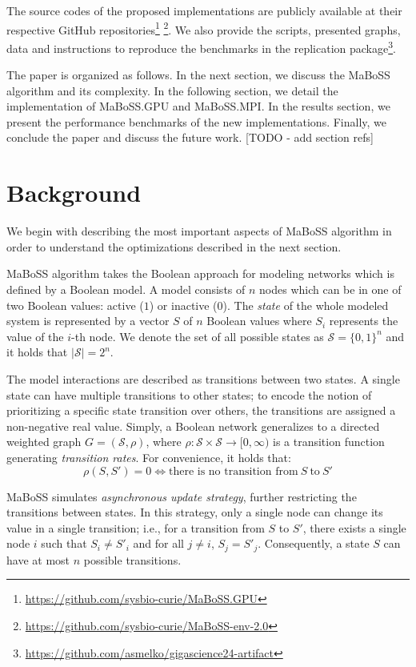 \documentclass[times, twoside]{zHenriquesLab-StyleBioRxiv}
\begin{document}
The source codes of the proposed implementations are publicly available at their respective GitHub repositories\footnote{\url{https://github.com/sysbio-curie/MaBoSS.GPU}} \footnote{\url{https://github.com/sysbio-curie/MaBoSS-env-2.0}}. We also provide the scripts, presented graphs, data and instructions to reproduce the benchmarks in the replication package\footnote{\url{https://github.com/asmelko/gigascience24-artifact}}.

The paper is organized as follows. In the next section, we discuss the MaBoSS algorithm and its complexity. In the following section, we detail the implementation of MaBoSS.GPU and MaBoSS.MPI. In the results section, we present the performance benchmarks of the new implementations. Finally, we conclude the paper and discuss the future work. [TODO - add section refs]


\section*{Background}

We begin with describing the most important aspects of MaBoSS algorithm in order to understand the optimizations described in the next section.  

MaBoSS algorithm takes the Boolean approach for modeling networks which is defined by a Boolean model. A model consists of $n$ nodes which can be in one of two Boolean values: active ($1$) or inactive ($0$). The \emph{state} of the whole modeled system is represented by a vector $S$ of $n$ Boolean values where $S_i$ represents the value of the $i$-th node. We denote the set of all possible states as $\mathcal{S} = \{0, 1\}^n$ and it holds that $|\mathcal{S}| = 2^n$. 

The model interactions are described as transitions between two states. A single state can have multiple transitions to other states; to encode the notion of prioritizing a specific state transition over others, the transitions are assigned a non-negative real value. Simply, a Boolean network generalizes to a directed weighted graph $G = (\mathcal{S}, \rho)$, where $\rho: \mathcal{S} \times \mathcal{S} \rightarrow [0, \infty)$ is a transition function generating \emph{transition rates}. For convenience, it holds that:
\begin{equation}
    \rho(S, S') = 0 \iff \text{there is no transition from}\ S\ \text{to}\ S'
\end{equation}

MaBoSS simulates \emph{asynchronous update strategy}, further restricting the transitions between states. In this strategy, only a single node can change its value in a single transition; i.e., for a transition from $S$ to $S'$, there exists a single node $i$ such that $S_i \neq S'_i$ and for all $j \neq i$, $S_j = S'_j$. Consequently, a state $S$ can have at most $n$ possible transitions.
\end{document}

